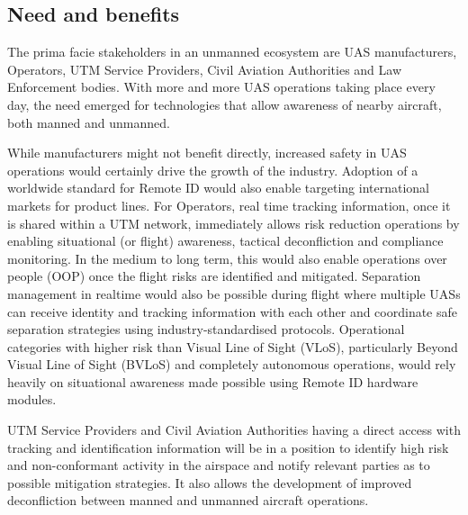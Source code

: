 \documentclass{ua_wgs_base}
\begin{document}
\subsection{Need and benefits}

The prima facie stakeholders in an unmanned ecosystem are UAS manufacturers,
Operators, UTM Service Providers, Civil Aviation Authorities and Law
Enforcement bodies. With more and more UAS operations taking place
every day, the need emerged for technologies that allow awareness
of nearby aircraft, both manned and unmanned. 

While manufacturers might not benefit directly, increased safety in
UAS operations would certainly drive the growth of the industry. Adoption
of a worldwide standard for Remote ID would also enable targeting
international markets for product lines. For Operators, real time
tracking information, once it is shared within a UTM network, immediately
allows risk reduction operations by enabling situational (or flight)
awareness, tactical deconfliction and compliance monitoring. In the
medium to long term, this would also enable operations over people
(OOP)
once the flight risks are identified and mitigated. Separation management
in realtime would also be possible during flight where multiple UASs
can receive identity and tracking information with each other and
coordinate safe separation strategies using industry-standardised
protocols. Operational categories with higher risk than Visual Line
of Sight (VLoS), particularly Beyond Visual Line of Sight (BVLoS)
and completely autonomous operations, would rely heavily on situational
awareness made possible using Remote ID hardware modules.

UTM Service Providers and Civil Aviation Authorities having a direct
access with tracking and identification information will be in a position
to identify high risk and non-conformant activity in the airspace
and notify relevant parties as to possible mitigation strategies.
It also allows the development of improved deconfliction between manned
and unmanned aircraft operations. 
\end{document}
